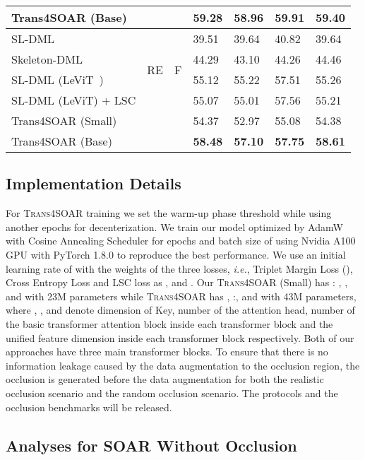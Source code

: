 \documentclass[lettersize,journal]{IEEEtran}
\begin{document}
\begin{table}[t]
{\begin{tabular}{l|c|c|llll}
Trans4SOAR (Base) &&& \textbf{59.28} & \textbf{58.96} & \textbf{59.91} &\textbf{59.40} \\ 
\midrule
SL-DML~\cite{memmesheimer2021sl} & \multirow{4}{*}{RE} & \multirow{4}{*}{F} & 39.51 & 39.64 & 40.82 & 39.64  \\
Skeleton-DML~\cite{memmesheimer2020skeleton_dml} & & & 44.29 & 43.10& 44.26& 44.46\\
SL-DML (LeViT~\cite{graham2021levit}) & & & 55.12 & 55.22& 57.51& 55.26\\

SL-DML (LeViT) + LSC & & & 55.07 & 55.01 & 57.56 &55.21 \\
Trans4SOAR (Small)&  &  & 54.37 & 52.97 & 55.08 &54.38  \\

Trans4SOAR (Base) & & & \textbf{58.48} & \textbf{57.10} & \textbf{57.75} & \textbf{58.61}  \\
\bottomrule
\end{tabular}}
\end{table}
\subsection{Implementation Details}
For \textsc{Trans4SOAR} training we set the warm-up phase threshold  while using another  epochs for decenterization. We train our model optimized by AdamW~\cite{loshchilov2017decoupled} with Cosine Annealing Scheduler for  epochs and batch size of  using Nvidia A100 GPU with PyTorch 1.8.0 to reproduce the best performance. We use an initial learning rate of  with the weights of the three losses, \textit{i.e.}, Triplet Margin Loss (), Cross Entropy Loss and LSC loss as ,  and . Our \textsc{Trans4SOAR} (Small) has : , ,  and  with 23M parameters while \textsc{Trans4SOAR} has , :,  and  with 43M parameters, where , ,  and  denote dimension of Key, number of the attention head, number of the basic transformer attention block inside each transformer block and the unified feature dimension inside each transformer block respectively. Both of our approaches have three main transformer blocks.
To ensure that there is no information leakage caused by the data augmentation to the occlusion region, the occlusion is generated before the data augmentation for both the realistic occlusion scenario and the random occlusion scenario.
The protocols and the occlusion benchmarks will be released.
\subsection{Analyses for SOAR Without Occlusion}
\end{document}
